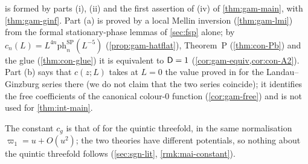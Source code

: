  is formed by parts (i), (ii) and the first assertion of (iv) of \cref{thm:gam-main}, with \cref{thm:gam-ginf}. Part (a) is proved by a local Mellin inversion (\cref{thm:gam-lmi}) from the formal stationary-phase lemmas of \cref{sec:fsp} alone; by $c_n(L)=L^{4n}\mathrm{ph}^{\mathrm{SP}}_n(L^{-5})$ (\cref{prop:gam-hatflat}), Theorem~P (\cref{thm:con-Pb}) and the glue (\cref{thm:con-glue}) it is equivalent to $\mathsf{D}=1$ (\cref{cor:gam-equiv,cor:con-A2}). Part (b) says that $c(z;L)$ takes at $L=0$ the value proved in \cite[Lemma~7.7, (37)]{GJR18} for the Landau--Ginzburg series there (we do not claim that the two series coincide); it identifies the free coefficients of the canonical colour-$0$ function (\cref{cor:gam-free}) and is not used for \cref{thm:int-main}.

\begin{rmk}
\label{rmk:int-constant}
The constant $c_g$ is that of \cite[Conjecture~1.5]{CGYZ26} for the quintic threefold, in the same normalisation $\varpi_1=u+O(u^2)$; the two theories have different potentials, so nothing about the quintic threefold follows (\cref{sec:sgn-lit}, \cref{rmk:mai-constant}). 
\end{rmk}


